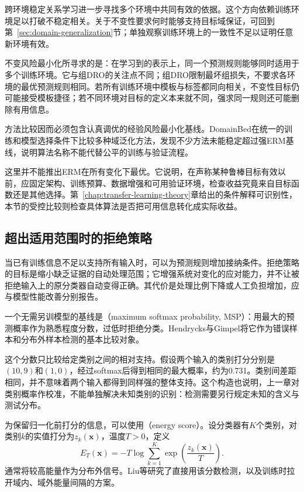 跨环境稳定关系学习进一步寻找多个环境中共同有效的依据。这个方向依赖训练环境足以打破不稳定相关。关于不变性要求何时能够支持目标域保证，可回到第~\ref{sec:domain-generalization}节；单独观察训练环境上的一致性不足以证明任意新环境有效。

不变风险最小化所寻求的是：在学习到的表示上，同一个预测规则能够同时适用于多个训练环境。它与组DRO的关注点不同；组DRO限制最坏组损失，不要求各环境的最优预测规则相同。若所有训练环境中模板与标签都同向相关，不变性目标仍可能接受模板捷径；若不同环境对目标的定义本来就不同，强求同一规则还可能删除有用信息。

方法比较因而必须包含认真调优的经验风险最小化基线。DomainBed在统一的训练和模型选择条件下比较多种域泛化方法，发现不少方法未能稳定超过强ERM基线，说明算法名称不能代替公平的训练与验证流程。

这里并不能推出ERM在所有变化下最优。它说明，在声称某种鲁棒目标有效以前，应固定架构、训练预算、数据增强和可用验证环境，检查收益究竟来自目标函数还是其他选择。第~\ref{chap:transfer-learning-theory}章给出的条件解释可识别性，本节的受控比较则检查具体算法是否把可用信息转化成实际收益。

\subsection{超出适用范围时的拒绝策略}
\label{sec:robustness-rejection}

当已有训练信息不足以支持所有输入时，可以为预测规则增加接纳条件。拒绝策略的目标是缩小缺乏证据的自动处理范围；它增强系统对变化的应对能力，并不让被拒绝输入上的原分类器自动变得正确。其代价是处理比例下降或人工负担增加，应与模型性能改善分别报告。

一个无需另训模型的基线是（maximum softmax probability, MSP）：用最大的预测概率作为熟悉程度分数，过低时拒绝分类。Hendrycks与Gimpel将它作为错误样本和分布外样本检测的基本比较对象。

这个分数只比较给定类别之间的相对支持。假设两个输入的类别打分分别是$(10,9)$和$(1,0)$，经过softmax后得到相同的最大概率，约为0.731。类别间差距相同，并不意味着两个输入都得到同样强的整体支持。这个构造也说明，上一章对类别概率作校准，不能单独解决未知类别的识别：检测需要另行规定未知的含义与测试分布。

为保留归一化前打分的信息，可以使用（energy score）。设分类器有$K$个类别，对类别$k$的实值打分为$z_k(\bm{x})$，温度$T>0$，定义
\begin{equation}
 E_T(\bm{x})=-T\log\sum_{k=1}^{K}
       \exp\!\left(\frac{z_k(\bm{x})}{T}\right).
 \label{eq:robustness-energy}
\end{equation}
通常将较高能量作为分布外信号。Liu等研究了直接用该分数检测，以及训练时拉开域内、域外能量间隔的方案。

